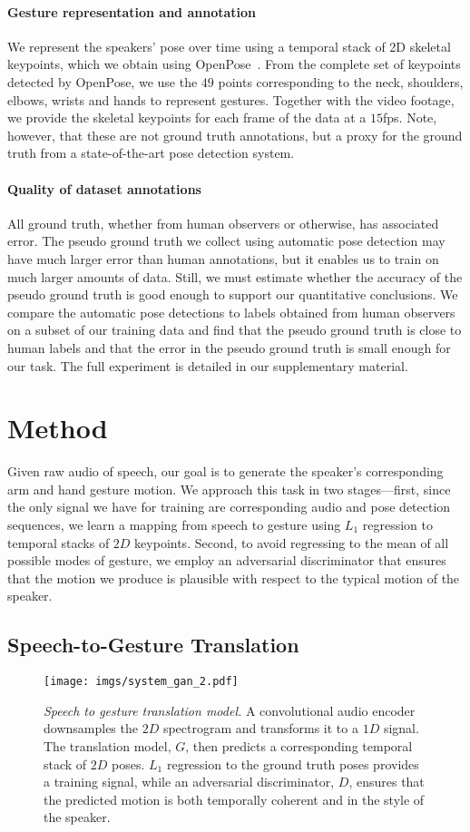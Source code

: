 \documentclass[10pt,twocolumn,letterpaper]{article}
\newcommand{\mypar}[1]{\vspace{-2mm}\paragraph{#1}}
\begin{document}
\mypar{Gesture representation and annotation}  We represent the speakers' pose over time using a temporal stack of 2D skeletal keypoints, which we obtain using OpenPose~\cite{cao2017realtime}. From the complete set of keypoints detected by OpenPose, we use the $49$ points corresponding to the neck, shoulders, elbows, wrists and hands to represent gestures. Together with the video footage, we provide the skeletal keypoints for each frame of the data at a $15$fps. Note, however, that these are not ground truth annotations, but a proxy for the ground truth from a state-of-the-art pose detection system.

\mypar{Quality of dataset annotations} All ground truth, whether from human observers or otherwise, has associated error. The pseudo ground truth we collect using automatic pose detection may have much larger error than human annotations, but it enables us to train on much larger amounts of data. Still, we must estimate whether the accuracy of the pseudo ground truth is good enough to support our quantitative conclusions. We compare the automatic pose detections to labels obtained from human observers on a subset of our training data and find that the pseudo ground truth is close to human labels and that the error in the pseudo ground truth is small enough for our task. The full experiment is detailed in our supplementary material.

\section{Method}
\label{sec:method}
Given raw audio of speech, our goal is to generate the speaker's corresponding arm and hand gesture motion. We approach this task in two stages---first, since the only signal we have for training are corresponding audio and pose detection sequences, we learn a mapping from speech to gesture using $L_1$ regression to temporal stacks of $2D$ keypoints. Second, to avoid regressing to the mean of all possible modes of gesture, we employ an adversarial discriminator that ensures that the motion we produce is plausible with respect to the typical motion of the speaker.

\subsection{Speech-to-Gesture Translation}
\label{sec:translation-arch}

\begin{figure}
\centering
\texttt{[image: imgs/system\_gan\_2.pdf]}
\vspace{-4mm}
  \caption{\emph{Speech to gesture translation model.} A convolutional audio encoder downsamples the $2D$ spectrogram and transforms it to a $1D$ signal. The translation model, $G$, then predicts a corresponding temporal stack of $2D$ poses. $L_1$ regression to the ground truth poses provides a training signal, while an adversarial discriminator, $D$, ensures that the predicted motion is both temporally coherent and in the style of the speaker.}
\label{fig:translation-arch}
\end{figure}
\end{document}
